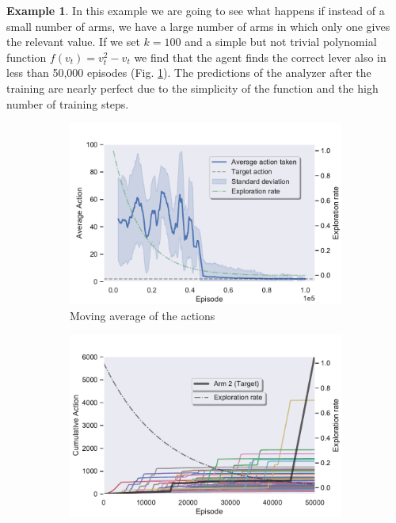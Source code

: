 \documentclass[11pt,a4paper,twoside]{report}
\newcommand{\+}{\textnormal{+} }
\theoremstyle{definition}
\newtheorem{myex}[mythm]{Example}
\numberwithin{equation}{chapter}
\begin{document}
  \begin{myex} \label{MAB3ex}
    In this example we are going to see what happens if instead of a small
    number of arms, we have a large number of arms in which only one gives
    the relevant value. If we set $k=100$ and a simple but not trivial
    polynomial function $f(v_t)=v_t^2-v_t$ we find that the agent finds the
    correct lever also in less than 50,000 episodes (Fig. \ref{fig:ActionAverageMAB3}). The
    predictions of the analyzer after the training are nearly perfect due to
    the simplicity of the function and the high number of training steps.

    \begin{figure}[]
      \centering
      \begin{subfigure}{.5\textwidth}
        \centering
        \includegraphics[width=1\linewidth]{figures/Actions-MAB3.pdf}
        \caption{Moving average of the actions}
        \label{fig:ActionAverageMAB3}
      \end{subfigure}%
      \begin{subfigure}{.5\textwidth}
        \centering
        \includegraphics[width=1\linewidth]{figures/Cum-action-MAB3.pdf}

\end{subfigure}
\end{figure}
\end{myex}
\end{document}
